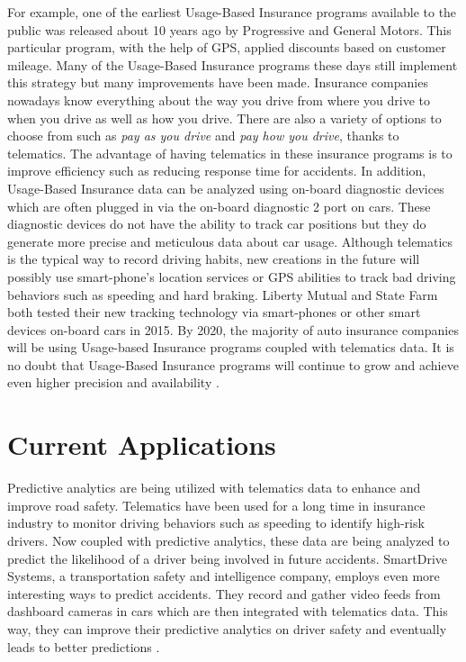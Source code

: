 For example, one of the earliest Usage-Based Insurance programs available to the public was released about 10 years ago by Progressive and General Motors. This particular program, with the help of GPS, applied discounts based on customer mileage. Many of the Usage-Based Insurance programs these days still implement this strategy but many improvements have been made. Insurance companies nowadays know everything about the way you drive from where you drive to when you drive as well as how you drive. There are also a variety of options to choose from such as {\em pay as you drive} and {\em pay how you drive}, thanks to telematics. The advantage of having telematics in these insurance programs is to improve efficiency such as reducing response time for accidents. In addition, Usage-Based Insurance data can be analyzed using on-board diagnostic devices which are often plugged in via the on-board diagnostic 2 port on cars. These diagnostic devices do not have the ability to track car positions but they do generate more precise and meticulous data about car usage. Although telematics is the typical way to record driving habits, new creations in the future will possibly use smart-phone's location services or GPS abilities to track bad driving behaviors such as speeding and hard braking. Liberty Mutual and State Farm both tested their new tracking technology via smart-phones or other smart devices on-board cars in 2015. By 2020, the majority of auto insurance companies will be using Usage-based Insurance programs coupled with telematics data. It is no doubt that Usage-Based Insurance programs will continue to grow and achieve even higher precision and availability \cite{Firm2016insurance}.

\section{Current Applications}

Predictive analytics are being utilized with telematics data to enhance and improve road safety. Telematics have been used for a long time in insurance industry to monitor driving behaviors such as speeding to identify high-risk drivers. Now coupled with predictive analytics, these data are being analyzed to predict the likelihood of a driver being involved in future accidents. SmartDrive Systems, a transportation safety and intelligence company, employs even more interesting ways to predict accidents. They record and gather video feeds from dashboard cameras in cars which are then integrated with telematics data. This way, they can improve their predictive analytics on driver safety and eventually leads to better predictions \cite{Banker2016accident}.

